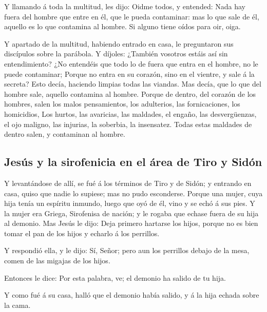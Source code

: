  Y llamando á toda la multitud, les dijo: Oidme todos, y
entended:  Nada hay fuera del hombre que entre en él, que
le pueda contaminar: mas lo que sale de él, aquello es lo que contamina
al hombre.  Si alguno tiene oídos para oir, oiga.

 Y apartado de la multitud, habiendo entrado en casa, le
preguntaron sus discípulos sobre la parábola.  Y díjoles:
¿También vosotros estáis así sin entendimiento? ¿No entendéis que todo
lo de fuera que entra en el hombre, no le puede contaminar;
 Porque no entra en su corazón, sino en el vientre, y sale
á la secreta? Esto decía, haciendo limpias todas las viandas.
 Mas decía, que lo que del hombre sale, aquello contamina
al hombre.  Porque de dentro, del corazón de los hombres,
salen los malos pensamientos, los adulterios, las fornicaciones, los
homicidios,  Los hurtos, las avaricias, las maldades, el
engaño, las desvergüenzas, el ojo maligno, las injurias, la soberbia, la
insensatez.  Todas estas maldades de dentro salen, y
contaminan al hombre.

\hypertarget{jesuxfas-y-la-sirofenicia-en-el-uxe1rea-de-tiro-y-siduxf3n}{%
\subsection{Jesús y la sirofenicia en el área de Tiro y
Sidón}\label{jesuxfas-y-la-sirofenicia-en-el-uxe1rea-de-tiro-y-siduxf3n}}

 Y levantándose de allí, se fué á los términos de Tiro y de
Sidón; y entrando en casa, quiso que nadie lo supiese; mas no pudo
esconderse.  Porque una mujer, cuya hija tenía un espíritu
inmundo, luego que oyó de él, vino y se echó á sus pies.  Y
la mujer era Griega, Sirofenisa de nación; y le rogaba que echase fuera
de su hija al demonio.  Mas Jesús le dijo: Deja primero
hartarse los hijos, porque no es bien tomar el pan de los hijos y
echarlo á los perrillos.

 Y respondió ella, y le dijo: Sí, Señor; pero aun los
perrillos debajo de la mesa, comen de las migajas de los hijos.

 Entonces le dice: Por esta palabra, ve; el demonio ha
salido de tu hija.

 Y como fué á su casa, halló que el demonio había salido, y
á la hija echada sobre la cama.

